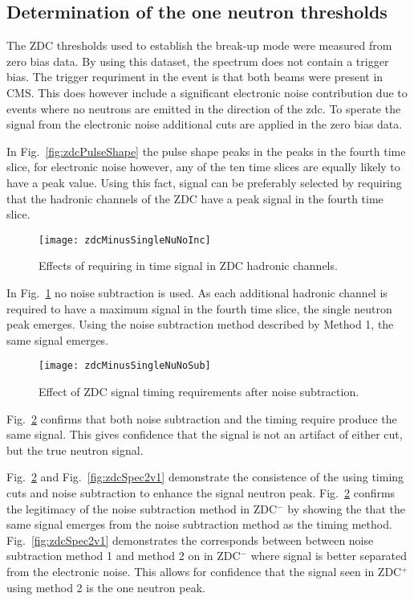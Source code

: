     \subsection{Determination of the one neutron thresholds}
      The ZDC thresholds used to establish the break-up mode were measured from
        zero bias data.
      By using this dataset, the spectrum does not contain a trigger bias. 
      The trigger requriment in the event is that both beams were present in 
        CMS.
      This does however include a significant electronic noise contribution due
        to events where no neutrons are emitted in the direction of the zdc.
      To sperate the signal from the electronic noise additional cuts are 
        applied in the zero bias data.

      In Fig.~\ref{fig:zdcPulseShape} the pulse shape peaks in the peaks in the
        fourth time slice, for electronic noise however, any of the ten time 
        slices are equally likely to have a peak value.
      Using this fact, signal can be preferably selected by requiring that the
        hadronic channels of the ZDC have a peak signal in the fourth time 
        slice.
      \begin{figure}[h]
        \centering
        \texttt{[image: zdcMinusSingleNuNoInc]}
        \caption{Effects of requiring in time signal in ZDC hadronic 
          channels.}
        \label{fig:zdcTimingCuts}
      \end{figure}
      In Fig.~\ref{fig:zdcTimingCuts} no noise subtraction is used. 
      As each additional hadronic channel is required to have a maximum signal
        in the fourth time slice, the single neutron peak emerges. 
      Using the noise subtraction method described by Method 1, the same signal
        emerges.
      \begin{figure}[h]
        \centering
        \texttt{[image: zdcMinusSingleNuNoSub]}
        \caption{Effect of ZDC signal timing requirements after noise 
          subtraction.}
        \label{fig:zdcTimingAfterNoiseSub}
      \end{figure}
      Fig.~\ref{fig:zdcTimingAfterNoiseSub} confirms that both noise 
        subtraction and the timing require produce the same signal.
      This gives confidence that the signal is not an artifact of either cut, 
        but the true neutron signal. 

      Fig.~\ref{fig:zdcTimingAfterNoiseSub} and Fig.~\ref{fig:zdcSpec2v1} 
        demonstrate the consistence of the using timing cuts and noise 
        subtraction to enhance the signal neutron peak. 
      Fig.~\ref{fig:zdcTimingAfterNoiseSub} confirms the legitimacy of the 
        noise subtraction method in ZDC$^{-}$ by showing the that the same signal
        emerges from the noise subtraction method as the timing method.
      Fig.~\ref{fig:zdcSpec2v1} demonstrates the corresponds between between
        noise subtraction method 1 and method 2 on in ZDC$^{-}$ where signal is 
        better separated from the electronic noise. 
      This allows for confidence that the signal seen in ZDC$^{+}$ using method 2 
        is the one neutron peak.

